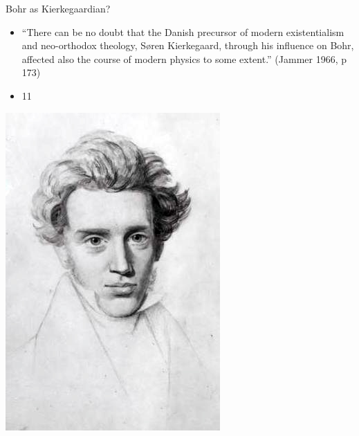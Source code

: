 \documentclass{beamer}
\begin{document}
\begin{frame}{Bohr as Kierkegaardian?}
\begin{itemize}
  \item “There can be no doubt that the Danish precursor of modern existentialism and neo-orthodox theology, Søren Kierkegaard, through his influence on Bohr, affected also the course of modern physics to some extent.” 
(Jammer 1966, p 173)
  \item 11
\end{itemize}
\includegraphics[width=0.9\linewidth]{slide11_img3.jpg}
\end{frame}
\end{document}
